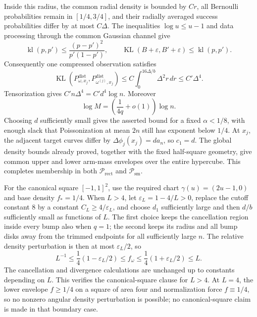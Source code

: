 Inside this radius, the common radial density is bounded by \(Cr\), all Bernoulli probabilities remain in \([1/4,3/4]\), and their radially averaged success probabilities differ by at most \(C\Delta\).  The inequalities \(\log u\leq u-1\) and data processing through the common Gaussian channel give
\[
\operatorname{kl}(p,p')\leq\frac{(p-p')^2}{p'(1-p')},
\qquad
\operatorname{KL}(B+\varepsilon,B'+\varepsilon)\leq\operatorname{kl}(p,p').
\]
Consequently one compressed observation satisfies
\[
\operatorname{KL}(P^{\mathrm{dist}}_{\omega,x_j},P^{\mathrm{dist}}_{\omega^{(j)},x_j})
\leq C\int_0^{16\Delta/b}\Delta^2r\,dr
\leq C'\Delta^4.
\]
Tensorization gives \(C'n\Delta^4=C'd^4\log n\).  Moreover
\[
\log M=\left(\frac{1}{4q}+o(1)\right)\log n.
\]
Choosing \(d\) sufficiently small gives the asserted bound for a fixed \(\alpha<1/8\), with enough slack that Poissonization at mean \(2n\) still has exponent below \(1/4\).  At \(x_j\), the adjacent target curves differ by \(\Delta\phi_j(x_j)=d a_n\), so \(c_1=d\).  The global density bounds already proved, together with the fixed half-square geometry, give common upper and lower arm-mass envelopes over the entire hypercube.  This completes membership in both \(\mathcal P_{\mathrm{rect}}\) and \(\mathcal P_{\mathrm{sm}}\).

For the canonical square \([-1,1]^2\), use the required chart \(\gamma(u)=(2u-1,0)\) and base density \(f_*=1/4\).  When \(L>4\), let \(\varepsilon_L=1-4/L>0\), replace the cutoff constant \(8\) by a constant \(C_L\geq4/\varepsilon_L\), and choose \(d_1\) sufficiently large and then \(d/b\) sufficiently small as functions of \(L\).  The first choice keeps the cancellation region inside every bump also when \(q=1\); the second keeps its radius and all bump disks away from the trimmed endpoints for all sufficiently large \(n\).  The relative density perturbation is then at most \(\varepsilon_L/2\), so
\[
L^{-1}\leq\frac14(1-\varepsilon_L/2)\leq f_\omega
\leq\frac14(1+\varepsilon_L/2)\leq L.
\]
The cancellation and divergence calculations are unchanged up to constants depending on \(L\).  This verifies the canonical-square clause for \(L>4\).  At \(L=4\), the lower envelope \(f\geq1/4\) on a square of area four and normalization force \(f\equiv1/4\), so no nonzero angular density perturbation is possible; no canonical-square claim is made in that boundary case.